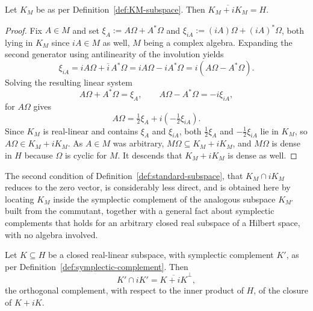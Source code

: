 \begin{lemma}[$K_M + iK_M$ is dense]\label{lem:KM-density}
	Let $K_M$ be as per Definition~\ref{def:KM-subspace}. Then $\overline{K_M + iK_M} = H$.
\end{lemma}

\begin{proof}
	Fix $A \in M$ and set $\xi_A := A\Omega + A^*\Omega$ and $\xi_{iA} := (iA)\Omega + (iA)^*\Omega$, both lying in $K_M$ since $iA \in M$ as well, $M$ being a complex algebra. Expanding the second generator using antilinearity of the involution yields
	\[
	\xi_{iA} = iA\Omega + \overline{i}\,A^*\Omega = iA\Omega - iA^*\Omega = i(A\Omega - A^*\Omega).
	\]
	Solving the resulting linear system
	\[
	A\Omega + A^*\Omega = \xi_A, \qquad A\Omega - A^*\Omega = -i\xi_{iA},
	\]
	for $A\Omega$ gives
	\[
	A\Omega = \tfrac{1}{2}\xi_A + i\left(-\tfrac{1}{2}\xi_{iA}\right).
	\]
	Since $K_M$ is real-linear and contains $\xi_A$ and $\xi_{iA}$, both $\tfrac{1}{2}\xi_A$ and $-\tfrac{1}{2}\xi_{iA}$ lie in $K_M$, so $A\Omega \in K_M + iK_M$. As $A \in M$ was arbitrary, $M\Omega \subseteq K_M + iK_M$, and $M\Omega$ is dense in $H$ because $\Omega$ is cyclic for $M$. It descends that $K_M + iK_M$ is dense as well.
\end{proof}

The second condition of Definition~\ref{def:standard-subspace}, that $K_M \cap iK_M$ reduces to the zero vector, is considerably less direct, and is obtained here by locating $K_M$ inside the symplectic complement of the analogous subspace $K_{M'}$ built from the commutant, together with a general fact about symplectic complements that holds for an arbitrary closed real subspace of a Hilbert space, with no algebra involved.

\begin{lemma}\label{lem:complement-intersection}
	Let $K \subseteq H$ be a closed real-linear subspace, with symplectic complement $K'$, as per Definition~\ref{def:symplectic-complement}. Then
	\[
	K' \cap iK' = \overline{K+iK}^{\perp},
	\]
	the orthogonal complement, with respect to the inner product of $H$, of the closure of $K+iK$.
\end{lemma}

